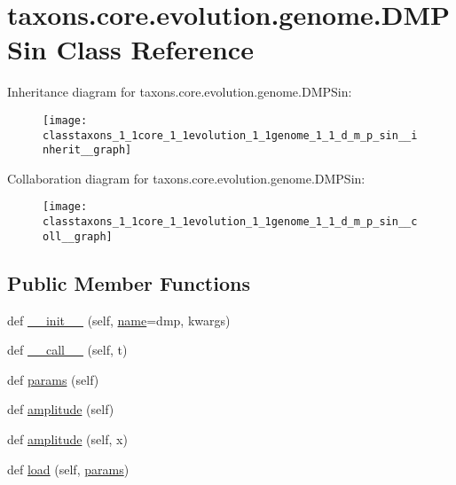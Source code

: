 \hypertarget{classtaxons_1_1core_1_1evolution_1_1genome_1_1_d_m_p_sin}{}\section{taxons.\+core.\+evolution.\+genome.\+D\+M\+P\+Sin Class Reference}
\label{classtaxons_1_1core_1_1evolution_1_1genome_1_1_d_m_p_sin}


Inheritance diagram for taxons.\+core.\+evolution.\+genome.\+D\+M\+P\+Sin\+:
\nopagebreak
\begin{figure}[H]
\begin{center}
\leavevmode
\texttt{[image: classtaxons\_1\_1core\_1\_1evolution\_1\_1genome\_1\_1\_d\_m\_p\_sin\_\_inherit\_\_graph]}
\end{center}
\end{figure}


Collaboration diagram for taxons.\+core.\+evolution.\+genome.\+D\+M\+P\+Sin\+:
\nopagebreak
\begin{figure}[H]
\begin{center}
\leavevmode
\texttt{[image: classtaxons\_1\_1core\_1\_1evolution\_1\_1genome\_1\_1\_d\_m\_p\_sin\_\_coll\_\_graph]}
\end{center}
\end{figure}
\subsection*{Public Member Functions}
\begin{DoxyCompactItemize}
\item 
def \hyperlink{classtaxons_1_1core_1_1evolution_1_1genome_1_1_d_m_p_sin_a7d38658cbde78218abe0cf40d983af47}{\+\_\+\+\_\+init\+\_\+\+\_\+} (self, \hyperlink{classtaxons_1_1core_1_1evolution_1_1genome_1_1_d_m_p_sin_a74df1cd58ac7a97c3e16565eca30346c}{name}=\textquotesingle{}dmp\textquotesingle{}, kwargs)
\item 
def \hyperlink{classtaxons_1_1core_1_1evolution_1_1genome_1_1_d_m_p_sin_a60d350bf80a524e5200b1a0da5d127ab}{\+\_\+\+\_\+call\+\_\+\+\_\+} (self, t)
\item 
def \hyperlink{classtaxons_1_1core_1_1evolution_1_1genome_1_1_d_m_p_sin_a0a3f79ae8e311bffe90d35aa1f28b5f4}{params} (self)
\item 
def \hyperlink{classtaxons_1_1core_1_1evolution_1_1genome_1_1_d_m_p_sin_a92a281541c0ac0c79ade60b323e97fc5}{amplitude} (self)
\item 
def \hyperlink{classtaxons_1_1core_1_1evolution_1_1genome_1_1_d_m_p_sin_a87b2732ceb2e9551616894685473f66c}{amplitude} (self, x)
\item 
def \hyperlink{classtaxons_1_1core_1_1evolution_1_1genome_1_1_d_m_p_sin_aa0eaff3edbe4ff9d291461c574a31f58}{load} (self, \hyperlink{classtaxons_1_1core_1_1evolution_1_1genome_1_1_d_m_p_sin_a0a3f79ae8e311bffe90d35aa1f28b5f4}{params})
\end{DoxyCompactItemize}
